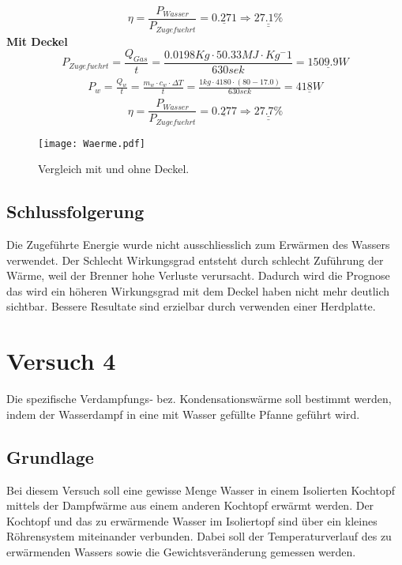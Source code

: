 \documentclass{article}
\begin{document}
\begin{equation}
\eta = \frac{P_{Wasser}}{P_{Zugefuehrt}} = \underline{0.271}\Rightarrow \underline{\underline{27.1\%}}
\end{equation}
\textbf{Mit Deckel}
\begin{equation}
P_{Zugefuehrt} = \frac{Q_{Gas}}{t} = \frac{0.0198Kg\cdot 50.33MJ \cdot Kg^-1}{630sek} = \underline{1509.9 W }
\end{equation}
\begin{align}
\begin{split}
P_{w} = \frac{Q_w}{t} = \frac{m_{w} \cdot c_{w} \cdot \Delta T}{t}=  \frac{1kg \cdot 4180 \cdot (80-17.0)}{630sek} = \underline{418W}
\end{split}
\end{align}
\begin{equation}
\eta = \frac{P_{Wasser}}{P_{Zugefuehrt}} = \underline{0.277}\Rightarrow \underline{\underline{27.7\%}}
\end{equation}
\begin{figure}[H]
\texttt{[image: Waerme.pdf]} 
\caption{Vergleich mit und ohne Deckel.}
\end{figure}


\subsection{Schlussfolgerung}
Die Zugeführte Energie wurde nicht ausschliesslich zum Erwärmen des Wassers verwendet. Der Schlecht Wirkungsgrad entsteht durch schlecht Zuführung der Wärme, weil der Brenner hohe Verluste verursacht. Dadurch wird die Prognose das wird ein höheren Wirkungsgrad mit dem Deckel haben nicht mehr deutlich sichtbar. Bessere Resultate sind erzielbar durch verwenden einer Herdplatte.
\section{Versuch 4}
Die spezifische Verdampfungs‐ bez. Kondensationswärme soll bestimmt werden, indem der Wasserdampf in eine
mit Wasser gefüllte Pfanne geführt wird.
\subsection{Grundlage}
Bei diesem Versuch soll eine gewisse Menge Wasser in einem Isolierten Kochtopf mittels der 
Dampfwärme aus einem anderen Kochtopf erwärmt werden. Der Kochtopf und das zu erwärmende 
Wasser im Isoliertopf sind über ein kleines Röhrensystem miteinander verbunden. Dabei soll der 
Temperaturverlauf des zu erwärmenden Wassers sowie die Gewichtsveränderung gemessen werden. 
\end{document}

